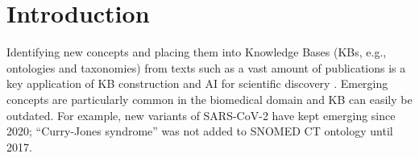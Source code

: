 \documentclass[sigconf]{acmart}
\begin{document}


\maketitle


\section{Introduction}
\label{sec:intro}
Identifying new concepts and placing them into Knowledge Bases (KBs, e.g., ontologies and taxonomies) from texts such as a vast amount of publications is a key application of KB construction and AI for scientific discovery \cite{hastings2023ai}. Emerging concepts are particularly common in the biomedical domain and KB can easily be outdated. For example, new variants of SARS-CoV-2 have kept emerging since 2020; ``Curry-Jones syndrome'' was not added to SNOMED CT ontology \cite{donnelly2006snomed} until 2017.
\end{document}
